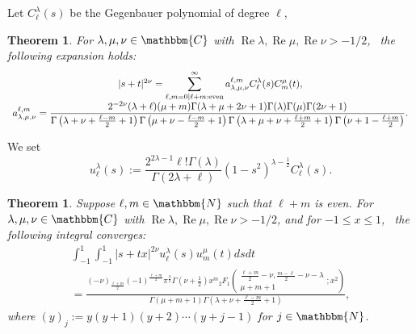 \documentclass[12pt]{article}
\numberwithin{equation}{section}
\newcommand{\assign}{:=}
\newcommand{\tmop}[1]{\ensuremath{\operatorname{#1}}}
\newtheorem{theorem}[corollary]{Theorem}
\newcommand{\mygrammarfootnote}[1]{}
\begin{document}
Let $C_{\ell}^{\lambda} (s)$ be the Gegenbauer polynomial of degree $\ell$,\mygrammarfootnote{maybe, dot here instead of comma?}
\begin{theorem}
  For $\lambda, \mu, \nu \in \mathbbm{C}$ with $\tmop{Re} \lambda, \tmop{Re}
  \mu, \tmop{Re} \nu > - 1 / 2$, \ the following expansion holds:
  \begin{equation*}
	  \begin{array}[]{c}
     | s + t |^{2 \nu} = \displaystyle\sum_{\ell, m = 0 \mid \ell + m :
    \tmop{even}}^{\infty} a_{\lambda, \mu, \nu}^{\ell, m} C_{\ell}^{\lambda}
    (s) C_m^{\mu} (t), \\
     \displaystyle a_{\lambda, \mu, \nu}^{\ell, m} = \frac{2^{- 2 \nu} (\lambda + \ell)
    (\mu + m) \Gamma (\lambda + \mu + 2 \nu + 1) \Gamma (\lambda) \Gamma (\mu)
    \Gamma (2 \nu + 1)}{\Gamma \left( \lambda + \nu + \frac{\ell - m}{2} + 1
    \right) \Gamma \left( \mu + \nu - \frac{\ell - m}{2} + 1 \right) \Gamma
    \left( \lambda + \mu + \nu + \frac{\ell + m}{2} + 1 \right) \Gamma \left(
    \nu + 1 - \frac{\ell + m}{2} \right)} .
	  \end{array}
  \end{equation*}
\end{theorem}
We set
\[ u_{\ell}^{\lambda} (s) \assign \frac{2^{2 \lambda - 1} \ell ! \Gamma
   (\lambda)}{\Gamma (2 \lambda + \ell)} (1 - s^2)^{\lambda - \frac{1}{2}}
   C_{\ell}^{\lambda} (s) . \]
\begin{theorem}
  \label{main-thm}Suppose $\ell, m \in \mathbbm{N}$ such that $\ell + m$ is
  even. For $\lambda, \mu, \nu \in \mathbbm{C}$ with $\tmop{Re} \lambda,
  \tmop{Re} \mu, \tmop{Re} \nu > - 1 / 2$, and for $- 1 \leqslant x \leqslant
  1$, \ the following integral converges:
  \begin{eqnarray}
    & \displaystyle\int_{- 1}^1 \displaystyle\int_{- 1}^1 | s + t x |^{2 \nu} u_{\ell}^{\lambda} (s)
    u_m^{\mu} (t) d s d t &  \nonumber\\
    & \displaystyle= \frac{(- \nu)_{\frac{\ell + m}{2}} (- 1)^{\frac{\ell + m}{2}}
    \pi^{\frac{3}{2}} \Gamma \left( \nu + \frac{1}{2} \right) x^m{}_2 F_1
    \left( \begin{array}{c}
      \frac{\ell + m}{2} - \nu, \frac{m - \ell}{2} - \nu - \lambda\\
      \mu + m + 1
    \end{array} ; x^2 \right)}{\Gamma (\mu + m + 1) \Gamma \left( \lambda +
    \nu + \frac{\ell - m}{2} + 1 \right)},  \label{eqn:main} & 
  \end{eqnarray}
  where $(y)_j \assign y (y + 1) (y + 2) \cdots (y + j - 1)$ for $j \in
  \mathbbm{N}$.
\end{theorem}
\end{document}
